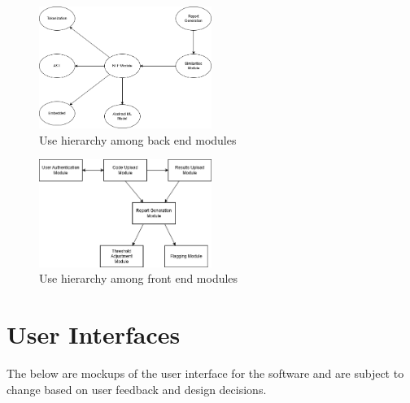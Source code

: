 \documentclass[12pt, titlepage]{article}
\begin{document}

\begin{figure}[H]
\centering
\includegraphics[width=0.5\textwidth]{../Assets/BackEndHierarchy.png}
\caption{Use hierarchy among back end modules}
\label{FigUHBE}
\end{figure}



\begin{figure}[H]
  \centering
  \includegraphics[width=0.5\textwidth]{../Assets/FrontEndHierarchy.png}
  \caption{Use hierarchy among front end modules}
  \label{FigUHFE}
  \end{figure}

\newpage
\section{User Interfaces}
The below are mockups of the user interface for the software and are subject to change based on user feedback and design decisions.
\end{document}
